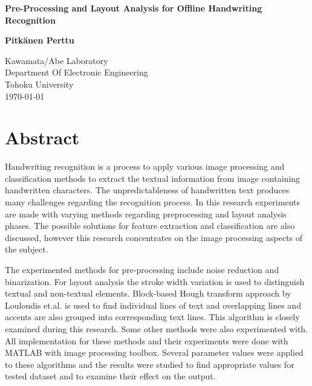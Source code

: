 \documentclass{article}
\begin{document}
   \begin{titlepage}
     \begin{center}
       \vspace*{1cm}

        \huge
        \textbf{Pre-Processing and Layout Analysis for Offline Handwriting Recognition}

        \vspace{1cm}
        \LARGE
        \textbf{Pitk{\"a}nen Perttu}

        \vfill
        \Large
        Kawamata/Abe Laboratory\\
        Department Of Electronic Engineering\\
        Tohoku University\\
        \today
     \end{center}
   \end{titlepage}

   \newpage
   \section*{Abstract}
    Handwriting recognition is a process to apply various image processing and classification methods to extract the textual information from image containing handwritten characters. The unpredictableness of handwritten text produces many challenges regarding the recognition process. In this research experiments are made with varying methods regarding preprocessing and layout analysis phases. The possible solutions for feature extraction and classification are also discussed, however this research concentrates on the image processing aspects of the subject.

    The experimented methods for pre-processing include noise reduction and binarization. For layout analysis the stroke width variation is used to distinguish textual and non-textual elements. Block-based Hough transform approach by Louloudis et.al. is used to find individual lines of text and overlapping lines and accents are also grouped into corresponding text lines. This algorithm is closely examined during this research. Some other methods were also experimented with. All implementation for these methods and their experiments were done with MATLAB with image processing toolbox. Several parameter values were applied to these algorithms and the results were studied to find appropriate values for tested dataset and to examine their effect on the output.
\end{document}
